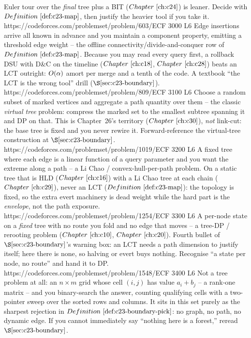 \begin{mixedset}
{     Euler tour over the \emph{final} tree plus a BIT (\(\chref{c24}\)) is leaner. Decide with
     \(\defref{c23-map}\), then justify the heavier tool if you take it.}
    {https://codeforces.com/problemset/problem/603/E}{CF 3000 L6}
    {Edge insertions arrive all known in advance and you maintain a component property, emitting a
     threshold edge weight -- the offline connectivity/divide-and-conquer row of \(\defref{c23-map}\).
     Because you may read every query first, a rollback DSU with D\&C on the timeline
     (\(\chref{c18}\), \(\chref{c28}\)) beats an LCT outright: \(O(\alpha)\) amort per merge and a
     tenth of the code. A textbook ``the LCT is the wrong tool'' drill (\(\secref{c23-boundary}\)).}
    {https://codeforces.com/problemset/problem/809/E}{CF 3100 L6}
    {Choose a random subset of marked vertices and aggregate a path quantity over them -- the classic
     \emph{virtual tree} problem: compress the marked set to the smallest subtree spanning it and DP
     on that. This is Chapter~26's territory (\(\chref{c30}\)), \emph{not} link-cut: the base tree is
     fixed and you never rewire it. Forward-reference the virtual-tree construction at
     \(\secref{c23-boundary}\).}
    {https://codeforces.com/problemset/problem/1019/E}{CF 3200 L6}
    {A fixed tree where each edge is a linear function of a query parameter and you want the
     extreme along a path -- a Li Chao / convex-hull-per-path problem. On a static tree that is HLD
     (\(\chref{c16}\)) with a Li Chao tree at each chain (\(\chref{c29}\)), never an LCT
     (\(\defref{c23-map}\)): the topology is fixed, so the extra evert machinery is dead weight while
     the hard part is the \emph{envelope}, not the path exposure.}
    {https://codeforces.com/problemset/problem/1254/E}{CF 3300 L6}
    {A per-node state on a \emph{fixed} tree with no route you fold and no edge that moves -- a
     tree-DP / rerooting problem (\(\chref{c10}\), \(\chref{c20}\)). Fourth bullet of
     \(\secref{c23-boundary}\)'s warning box: an LCT needs a path dimension to justify itself; here
     there is none, so halving or evert buys nothing. Recognise ``a state per node, no route'' and
     hand it to DP.}
    {https://codeforces.com/problemset/problem/1548/E}{CF 3400 L6}
    {Not a tree problem at all: an \(n\times m\) grid whose cell \((i,j)\) has value
     \(a_i+b_j\) -- a rank-one matrix -- and you binary-search the answer, counting qualifying cells
     with a two-pointer sweep over the sorted rows and columns. It sits in this set purely as the
     sharpest rejection in \(\defref{c23-boundary-pick}\): no graph, no path, no dynamic edge. If
     you cannot immediately say ``nothing here is a forest,'' reread \(\secref{c23-boundary}\).}
\end{mixedset}


